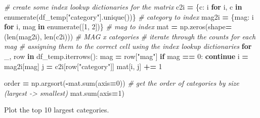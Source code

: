 \documentclass[
]{book}
\newenvironment{Shaded}{\begin{snugshade}}{\end{snugshade}}
\newcommand{\BuiltInTok}[1]{#1}
\newcommand{\CommentTok}[1]{\textcolor[rgb]{0.56,0.35,0.01}{\textit{#1}}}
\newcommand{\ControlFlowTok}[1]{\textcolor[rgb]{0.13,0.29,0.53}{\textbf{#1}}}
\newcommand{\DecValTok}[1]{\textcolor[rgb]{0.00,0.00,0.81}{#1}}
\newcommand{\KeywordTok}[1]{\textcolor[rgb]{0.13,0.29,0.53}{\textbf{#1}}}
\newcommand{\NormalTok}[1]{#1}
\newcommand{\OperatorTok}[1]{\textcolor[rgb]{0.81,0.36,0.00}{\textbf{#1}}}
\newcommand{\StringTok}[1]{\textcolor[rgb]{0.31,0.60,0.02}{#1}}
\begin{document}
\begin{Shaded}
\begin{Highlighting}[numbers=left,,]
\CommentTok{\# create some index lookup dictionaries for the matrix}
\NormalTok{c2i }\OperatorTok{=}\NormalTok{ \{c: i }\ControlFlowTok{for}\NormalTok{ i, c }\KeywordTok{in} \BuiltInTok{enumerate}\NormalTok{(df\_temp[}\StringTok{"category"}\NormalTok{].unique())\}    }\CommentTok{\# category to index}
\NormalTok{mag2i }\OperatorTok{=}\NormalTok{ \{mag: i }\ControlFlowTok{for}\NormalTok{ i, mag }\KeywordTok{in} \BuiltInTok{enumerate}\NormalTok{([}\DecValTok{1}\NormalTok{, }\DecValTok{2}\NormalTok{])\}                    }\CommentTok{\# mag to index}
\NormalTok{mat }\OperatorTok{=}\NormalTok{ np.zeros(shape}\OperatorTok{=}\NormalTok{(}\BuiltInTok{len}\NormalTok{(mag2i), }\BuiltInTok{len}\NormalTok{(c2i))) }\CommentTok{\# MAG x categories}
\CommentTok{\# iterate through the counts for each mag}
\CommentTok{\# assigning them to the correct cell using the index lookup dictionaries}
\ControlFlowTok{for}\NormalTok{ \_, row }\KeywordTok{in}\NormalTok{ df\_temp.iterrows():}
\NormalTok{    mag }\OperatorTok{=}\NormalTok{ row[}\StringTok{"mag"}\NormalTok{]}
    \ControlFlowTok{if}\NormalTok{ mag }\OperatorTok{==} \DecValTok{0}\NormalTok{: }\ControlFlowTok{continue}
\NormalTok{    i }\OperatorTok{=}\NormalTok{ mag2i[mag]}
\NormalTok{    j }\OperatorTok{=}\NormalTok{ c2i[row[}\StringTok{"category"}\NormalTok{]]}
\NormalTok{    mat[i, j] }\OperatorTok{+=} \DecValTok{1}

\NormalTok{order }\OperatorTok{=}\NormalTok{ np.argsort(}\OperatorTok{{-}}\NormalTok{mat.}\BuiltInTok{sum}\NormalTok{(axis}\OperatorTok{=}\DecValTok{0}\NormalTok{)) }\CommentTok{\# get the order of categories by size (largest {-}\textgreater{} smallest)}
\NormalTok{mat.}\BuiltInTok{sum}\NormalTok{(axis}\OperatorTok{=}\DecValTok{1}\NormalTok{)}
\end{Highlighting}
\end{Shaded}

Plot the top 10 largest categories.
\end{document}
